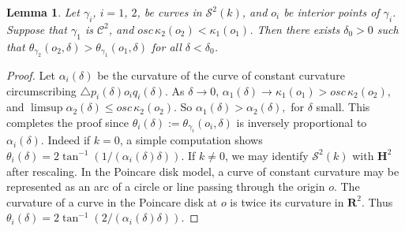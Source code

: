 \documentclass[11pt]{amsart}
\newtheorem{lemma}[theorem]{Lemma}
\theoremstyle{definition}
\newcommand{\R}{\mathbf{R}}
\newcommand{\C}{\mathcal{C}}
\begin{document}
\begin{lemma}\label{lem:angle}
Let $\gamma_i$, $i=1$, $2$, be curves in $\mathcal{S}^2(k)$, and $o_i$ be interior points of $\gamma_i$. Suppose that  $\gamma_1$ is $\C^2$, and ${osc\, \kappa_2}(o_2)< \kappa_1(o_1)$. Then there exists $\delta_0>0$ such that $\theta_{\gamma_2}(o_2,\delta)>\theta_{\gamma_1}(o_1,\delta)$ for all $\delta<\delta_0$.
\end{lemma}
\begin{proof}
Let $\alpha_i(\delta)$ be the curvature of the curve of constant curvature circumscribing $\triangle p_i(\delta)o_iq_i(\delta)$.
As $\delta\to0$, $\alpha_1(\delta)\to\kappa_1(o_1)> {osc\, \kappa_2}(o_2)$, and $\limsup\alpha_2(\delta)\leq {osc\, \kappa_2}(o_2)$. So
$
\alpha_1(\delta)>\alpha_2(\delta),
$
for $\delta$ small. This completes the proof since $\theta_i(\delta):=\theta_{\gamma_i}(o_i,\delta)$ is inversely proportional to $\alpha_i(\delta)$. Indeed
if $k=0$, a simple computation shows $\theta_i(\delta)=2\tan^{-1}(1/(\alpha_i(\delta)\delta))$. If $k\neq 0$, we may identify $\mathcal{S}^2(k)$ with $\textbf{H}^2$ after rescaling. In the Poincare disk model, a curve of constant curvature may be represented as an arc of a circle or line passing through the origin $o$. The curvature of a curve in the Poincare disk at $o$ is twice its curvature in $\R^2$. Thus $\theta_i(\delta)=2\tan^{-1}(2/(\alpha_i(\delta)\delta))$. 
\end{proof}
\end{document}
